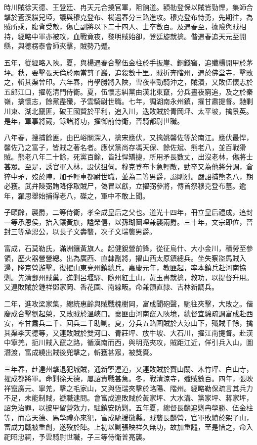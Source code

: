 \begin{pinyinscope}
時川賊徐天德、王登廷、冉天元合撓官軍，阻餉道。額勒登保以賊皆勁悍，集師合擊於蒼溪貓兒埡，議與穆克登布、楊遇春分三路進攻。穆克登布恃勇，先期往，為賊所乘，腹背受敵，傷亡副將以下二十四人、士卒數百。及遇春至，據險與賊相持，經略中軍亦被攻，血戰竟夜，黎明賊始卻，登廷旋就擒。偕遇春追天元至開縣，與德楞泰會師夾擊，賊勢乃蹙。

五年，從經略入陜。夏，與楊遇春合擊伍金柱於手扳崖、銅錢窖，追殲楊開甲於茅坪。秋，要擊張天倫於兩當剪子巖，追殺數十里。賊折奔階州，遇於佛堂寺，擊敗之，斬其渠曾印。六年春，冉學勝將入陜，雪夜率勁騎沖之，賊潰，又敗伍懷志於五郎江口，擢乾清門侍衛。夏，伍懷志糾黨由漢北東竄，分兵晝夜窮追，及之於秦嶺，擒懷志，餘黨盡殲，予雲騎尉世職。七年，調湖南永州鎮，擢甘肅提督。馳剿川東、湖北竄匪，破王國賢於平利，追入川，迭敗賊於青岡坪、太平坡，擒景英。是年，軍事將蕆，錄諸將功，擢御前侍衛，晉騎都尉世職。

八年春，搜捕餘匪，由巴峪關深入，擒宋應伏，又擒姚馨佐等於南江。應伏最悍，馨佐乃之富子，皆賊之著名者。應伏黨尚存馮天保、餘佐斌、熊老八，並百戰猾賊。熊老八年二十餘，死黨百餘，皆壯悍矯捷，所用矛長數丈，出沒老林，傷將士甚眾。至是，誘官軍入林，設伏狙伺。穆克登布卞急輕敵，勁卒又為他將分調，倉猝中矛，歿於陣，加予輕車都尉世職，並為二等男爵，謚剛烈。嚴詔捕熊老八，期必獲。武弁陳弼賄降俘取賊尸，偽冒以獻，立擢弼參將，傳首祭穆克登布墓。逾年，羅思舉始捕得老八，磔之，軍中不敢上聞。

子頤齡，襲爵，二等侍衛，孝全成皇后之父也。道光十四年，冊立皇后禮成，追封一等承恩侯，抬入鑲黃旗，謚榮僖，以孫瑚圖哩兼襲兩爵。三十年，文宗即位，晉封三等承恩公，以長子文壽襲，次子文瑞襲男爵。

富成，石莫勒氏，滿洲鑲黃旗人。起健銳營前鋒，從征烏什、大小金川，積勞至參領，歷火器營營總。出為廣西、直隸副將，擢山西太原鎮總兵。坐失察盜馬賊入邊，降京營游擊。復擢山東兗州鎮總兵。嘉慶元年，教匪起，率本鎮兵赴河南協剿。先清鄧州賊巢，進剿呂堰驛、隨州紅土山，黃玉書就擒，敘功，以提督升用。又連敗賊於鍾祥鄧家岡、香花園、南線畈。命兼領直隸、吉林新調兵。

二年，進攻梁家集，總統惠齡與賊戰槐樹岡，富成聞砲聲，馳往夾擊，大敗之。偕慶成合擊劉起榮，又敗賊於溫峽口。襄匪由河南竄入陜境，總督宜綿疏調富成赴西安，率甘肅兵二千、回兵二千助剿。夏，分兵五路圍賊於大涼山下，殲賊千餘，擒其渠李天德等，又連敗賊於雙河口、青莊坪、放牛坡、大石川，擢江南提督。赴漢中寧羌，扼川賊入竄之路，循漢南而西，與明亮夾攻，賊距江近，佯引兵入山，圖潛渡，富成繞出賊後兜擊之，斬獲甚眾，被獎賚。

三年春，赴達州擊退犯城賊，通新寧運道，又連敗賊於竇山關、木竹坪、白山寺，擢成都將軍。命剿徐天德，屢詔責戰甚急。冬，戰清涼寺，殲賊數百。四年，張映祥竄廣元、寧羌，擊之毛家山，又與恆瑞夾擊於略陽、階州。經略勒保疏言其兵力不足，未能制賊，褫職逮問。會富成連敗賊於黃家坪、大水溝、黨家坪、蔣家坪，詔免治罪，以披甲留營效力，駐鎮安防剿。五年夏，總督長麟追剿冉學勝、伍金柱等，而高天德、馬學禮亦來犯，富成馳援徽縣。賊襲長麟營，官軍敗績於架子山，富成力戰被重創，遂歿於陣。上初以剿張映祥久無功，故加重譴，至是惜之，命入祀昭忠祠，予雲騎尉世職，子三等侍衛普亮襲。


\end{pinyinscope}
